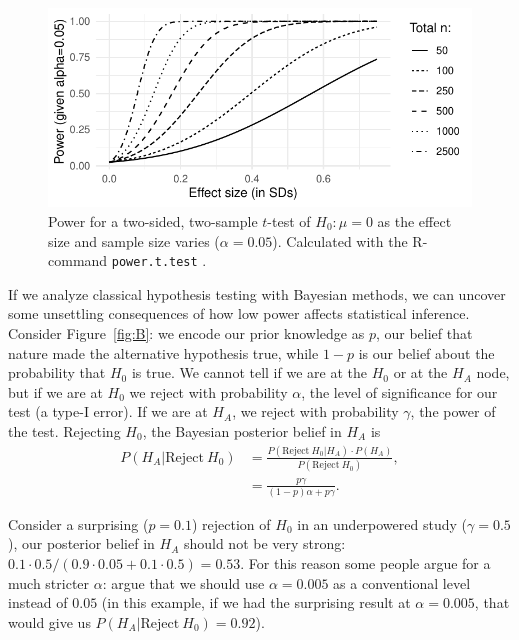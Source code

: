 \documentclass[10pt]{article}
\begin{document}
\begin{figure}[tb]
\includegraphics[width=\textwidth]{../graphs/powergraph}

\caption{Power for a two-sided, two-sample $t$-test of $H_0: \mu=0$ as the effect 
size and sample size varies ($\alpha=0.05$). Calculated with the R-command \texttt{power.t.test} \citep{R2023}.}\label{fig:power}
\end{figure}


If we analyze classical hypothesis testing with Bayesian methods, we can uncover
some unsettling consequences of how low power affects statistical inference.
Consider Figure~\ref{fig:B}: we encode our prior knowledge as $p$, our belief
that nature made the alternative hypothesis true, while $1-p$ is our belief
about the probability that $H_0$ is true. We cannot tell if we are at the
$H_0$ or at the $H_{\!A}$ node, but if we are at $H_0$ we reject with probability $\alpha$,
the level of significance for our test (a type-I error). If we are at $H_{\!A}$, we
reject with probability $\gamma$, the power of the test. Rejecting $H_0$, the
Bayesian posterior belief in $H_{\!A}$ is
\begin{align*}
   P(H_{\!A}|\mathrm{Reject}\ H_0) & = \frac{P(\mathrm{Reject}\ H_0|H_{\!A}) \cdot P(H_{\!A})}{P(\mathrm{Reject}\ H_0)}, \\
   &= \frac{p\gamma}{(1-p)\alpha + p\gamma}.  
\end{align*}

Consider a surprising ($p=0.1$) rejection of $H_0$  in an underpowered study ($\gamma=0.5$),
our posterior belief in $H_{\!A}$ should not be very strong: $0.1\cdot 0.5 /
(0.9\cdot 0.05 + 0.1\cdot 0.5) = 0.53$. For this reason some people argue for a
much stricter $\alpha$: \citet{Benjamin2017} argue that we should use
$\alpha=0.005$ as a conventional level instead of $0.05$ (in this example, if we had
the surprising result at $\alpha=0.005$, that would give us $P(H_{\!A}|\mathrm{Reject}\ H_0)=0.92$). 
\end{document}
